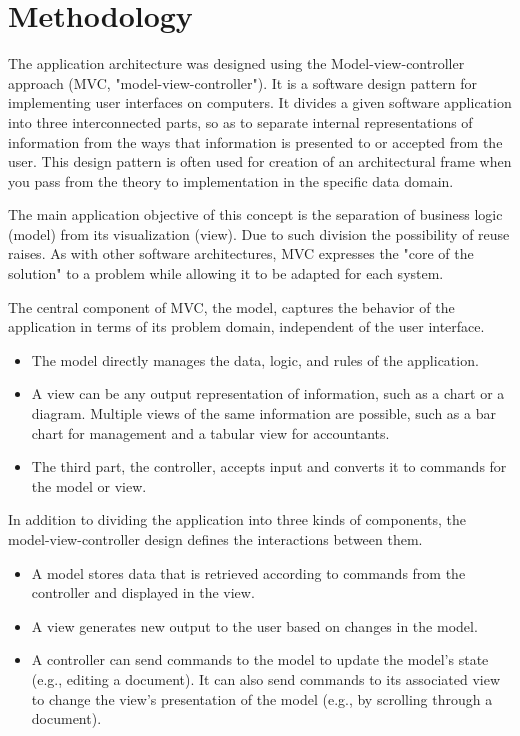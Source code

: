 \section{Methodology}\label{sec:review}

The application architecture was designed using the Model-view-controller approach (MVC, "model-view-controller"). It is a software design pattern for implementing user interfaces on computers. It divides a given software application into three interconnected parts, so as to separate internal representations of information from the ways that information is presented to or accepted from the user. This design pattern is often used for creation of an architectural frame when you pass from the theory to implementation in the specific data domain.

The main application objective of this concept is the separation of business logic (model) from its visualization (view). Due to such division the possibility of reuse raises. 
As with other software architectures, MVC expresses the "core of the solution" to a problem while allowing it to be adapted for each system.

The central component of MVC, the model, captures the behavior of the application in terms of its problem domain, independent of the user interface.

\begin {itemize}
\item The model directly manages the data, logic, and rules of the application.
\item A view can be any output representation of information, such as a chart or a diagram. Multiple views of the same information are possible, such as a bar chart for management and a tabular view for accountants.
\item The third part, the controller, accepts input and converts it to commands for the model or view.
\end {itemize}

In addition to dividing the application into three kinds of components, the model-view-controller design defines the interactions between them.

\begin {itemize}
\item A model stores data that is retrieved according to commands from the controller and displayed in the view.
\item A view generates new output to the user based on changes in the model.
\item A controller can send commands to the model to update the model's state (e.g., editing a document). It can also send commands to its associated view to change the view's presentation of the model (e.g., by scrolling through a document).
\end {itemize}

